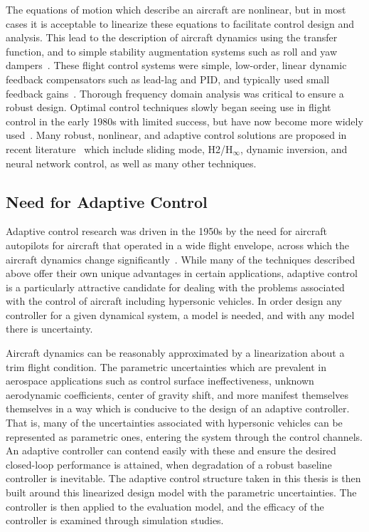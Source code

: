 The equations of motion which describe an aircraft are nonlinear, but in most cases it is acceptable to linearize these equations to facilitate control design and analysis.
This lead to the description of aircraft dynamics using the transfer function, and to simple stability augmentation systems such as roll and yaw dampers\ \cite{cook.flightdynamics.2007}.
These flight control systems were simple, low-order, linear dynamic feedback compensators such as lead-lag and PID, and typically used small feedback gains\ \cite{dazzo.linearcontrol.2003,mclean.flightcontrol.1990,yechout.flightmechanics.2003}.
Thorough frequency domain analysis was critical to ensure a robust design.
Optimal control techniques slowly began seeing use in flight control in the early 1980s with limited success, but have now become more widely used\ \cite{chandler.lqrshortcomings.1983,abzug.stability.2005,stevenslewis.aircraftcontrol.2003,stengel.flightdynamics.2004}.
Many robust, nonlinear, and adaptive control solutions are proposed in recent literature\ \cite{xu.adaptive.2004,gibson.adaptive.2008,hughes.hinfinity.2010,huang.robust.2012,bolender.hifire6.2012,rollins.nonlinear.2013} which include sliding mode, H2/H$_{\infty}$, dynamic inversion, and neural network control, as well as many other techniques.

\subsection{Need for Adaptive Control}

Adaptive control research was driven in the 1950s by the need for aircraft autopilots for aircraft that operated in a wide flight envelope, across which the aircraft dynamics change significantly\ \cite{astrom.feedback.1987}.
While many of the techniques described above offer their own unique advantages in certain applications, adaptive control is a particularly attractive candidate for dealing with the problems associated with the control of aircraft including hypersonic vehicles.
In order design any controller for a given dynamical system, a model is needed, and with any model there is uncertainty.

Aircraft dynamics can be reasonably approximated by a linearization about a trim flight condition.
The parametric uncertainties which are prevalent in aerospace applications such as control surface ineffectiveness, unknown aerodynamic coefficients, center of gravity shift, and more manifest themselves themselves in a way which is conducive to the design of an adaptive controller.
That is, many of the uncertainties associated with hypersonic vehicles can be represented as parametric ones, entering the system through the control channels.
An adaptive controller can contend easily with these and ensure the desired closed-loop performance is attained, when degradation of a robust baseline controller is inevitable.
The adaptive control structure taken in this thesis is then built around this linearized design model with the parametric uncertainties.
The controller is then applied to the evaluation model, and the efficacy of the controller is examined through simulation studies.

